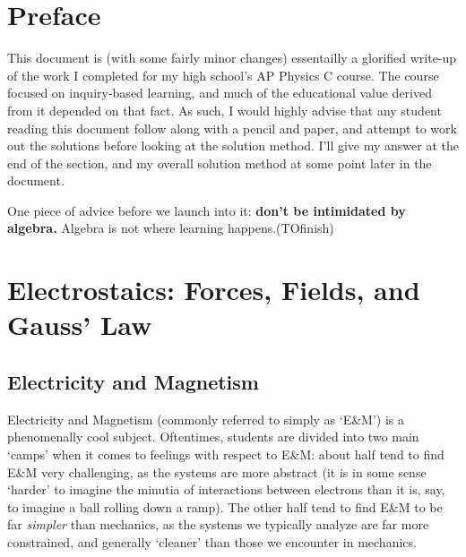 \documentclass[10pt]{article}
\theoremstyle{definition}
\begin{document}
{\large%
\thispagestyle{empty}
\clearpage
\tableofcontents
\clearpage
\pagestyle{fancy}
\section{Preface}
This document is (with some fairly minor changes) essentailly a
glorified write-up of the work I completed for my high school's AP
Physics C course.  The course focused on inquiry-based learning, and
much of the educational value derived from it depended on that fact.
As such, I would highly advise that any student reading this document
follow along with a pencil and paper, and attempt to work out the
solutions before looking at the solution method.  I'll give my answer
at the end of the section, and my overall solution method at some
point later in the document.

One piece of advice before we launch into it: \textbf{don't be
  intimidated by algebra.}  Algebra is not where learning happens.(TOfinish)
\section{Electrostaics: Forces, Fields, and Gauss' Law}
\subsection{Electricity and Magnetism}
Electricity and Magnetism (commonly referred to simply as `E\&M') is a
phenomenally cool subject.  Oftentimes, students are divided into two
main `camps' when it comes to feelings with respect to E\&M: about
half tend to find E\&M very challenging, as the systems are more
abstract (it is in some sense `harder' to imagine the minutia of
interactions between electrons than it is, say, to imagine a ball
rolling down a ramp).  The other half tend to find E\&M to be far
\emph{simpler} than mechanics, as the systems we typically analyze are
far more constrained, and generally `cleaner' than those we encounter
in mechanics.

}
\end{document}
